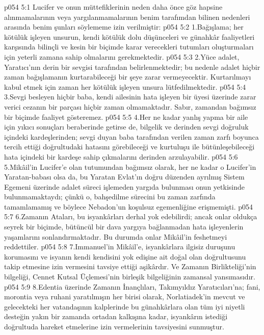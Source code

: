 \vs p054 5:1 Lucifer ve onun müttefiklerinin neden daha önce göz hapsine alınmamalarının veya yargılanmamalarının benim tarafımdan bilinen nedenleri arasında benim şunları söylememe izin verilmiştir:
\vs p054 5:2 1.\bibnobreakspace Bağışlama; her kötülük işleyen unsurun, kendi kötülük dolu düşünceleri ve günahkâr faaliyetleri karşısında bilinçli ve kesin bir biçimde karar verecekleri tutumları oluşturmaları için yeterli zamana sahip olmalarını gerekmektedir.
\vs p054 5:3 2.\bibnobreakspace Yüce adalet, Yaratıcı’nın derin bir sevgisi tarafından belirlenmektedir; bu nedenle adalet hiçbir zaman bağışlamanın kurtarabileceği bir şeye zarar vermeyecektir. Kurtarılmayı kabul etmek için zaman her kötülük işleyen unsura lütfedilmektedir.
\vs p054 5:4 3.\bibnobreakspace Sevgi besleyen hiçbir baba, kendi ailesinin hata işleyen bir üyesi üzerinde zarar verici cezanın bir parçası hiçbir zaman olmamaktadır. Sabır, zamandan bağımsız bir biçimde faaliyet gösteremez.
\vs p054 5:5 4.\bibnobreakspace Her ne kadar yanlış yapma bir aile için yıkıcı sonuçları beraberinde getirse de, bilgelik ve derinden sevgi doğruluk içindeki kardeşlerinden; sevgi duyan baba tarafından verilen zaman zarfı boyunca tercih ettiği doğrultudaki hatasını görebileceği ve kurtuluşu ile bütünleşebileceği hata içindeki bir kardeşe sahip çıkmalarını derinden arzulayabilir.
\vs p054 5:6 5.\bibnobreakspace Mikâil’in Lucifer’e olan tutumundan bağımsız olarak, her ne kadar o Lucifer’in Yaratan\hyp{}babası olsa da, bu Yaratan Evlat’ın doğru düzenden ayrılmış Sistem Egemeni üzerinde adalet süreci işlemeden yargıda bulunması onun yetkisinde bulunmamaktaydı; çünkü o, bahşedilme sürecini bu zaman zarfında tamamlamamış ve böylece Nebadon’un koşulsuz egemenliğine erişmemişti.
\vs p054 5:7 6.\bibnobreakspace Zamanın Ataları, bu isyankârları derhal yok edebilirdi; ancak onlar oldukça seyrek bir biçimde, bütüncül bir dava yargıya bağlanmadan hata işleyenlerin yaşamlarını sonlandırmaktadır. Bu durumda onlar Mikâil’in feshetmeyi reddettiler.
\vs p054 5:8 7.\bibnobreakspace Immanuel’in Mikâil’e, isyankârlara ilgisiz duruşunu korumasını ve isyanın kendi kendisini yok edişine ait doğal olan doğrultusunu takip etmesine izin vermesini tavsiye ettiği aşikârdır. Ve Zamanın Birlikteliği’nin bilgeliği, Cennet Kutsal Üçlemesi’nin birleşik bilgeliğinin zamansal yansımasıdır.
\vs p054 5:9 8.\bibnobreakspace Edentia üzerinde Zamanın İnançlıları, Takımyıldız Yaratıcıları’na; fani, morontia veya ruhani yaratılmışın her birisi olarak, Norlatiadek’in mevcut ve gelecekteki her vatandaşının kalplerinde bu günahkârlara olan tüm iyi niyetli desteğin yakın bir zamanda ortadan kalkışına kadar, isyankârın istediği doğrultuda hareket etmelerine izin vermelerinin tavsiyesini sunmuştur.
